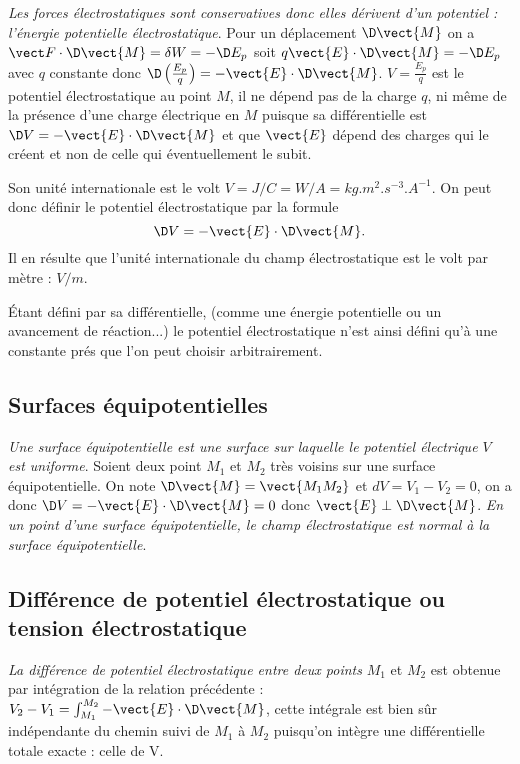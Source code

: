 \emph{Les forces électrostatiques sont conservatives donc elles dérivent d'un potentiel : l'énergie potentielle électrostatique}. Pour un déplacement $\D \vect{M}$ on a $\vF \cdot \D \vect{M}=\delta W = -\D E_p$ soit $ q \vect{E} \cdot \D \vect{M}=-\D E_p$ avec $q$ constante donc $\D \left(\frac{E_p}{q}\right) = -\vect{E} \cdot \D \vect{M}$.
$V = \frac{E_p}{q}$ est le potentiel électrostatique au point $M$, il ne dépend pas de la charge $q$, ni même de la présence d'une charge électrique en $M$ puisque sa différentielle est $\D V = -\vect{E} \cdot \D \vect{M}$ et que $\vect{E}$ dépend des charges qui le créent et non de celle qui éventuellement le subit.

Son unité internationale est le volt  $\si{V} = \si{J/C} =\si{W/A} = \si{kg.m^2.s^{-3}.A^{-1}}$. On peut donc définir le potentiel électrostatique par la formule
\begin{equation}
 \D V = -\vect{E} \cdot \D \vect{M}.
\end{equation}
Il en résulte que l'unité internationale du champ électrostatique est le volt par mètre : $\si{V/m}$.

Étant défini par sa différentielle, (comme une énergie potentielle ou un avancement de réaction...) le potentiel électrostatique n'est ainsi défini qu'à une constante prés que l'on peut choisir arbitrairement.

\subsection{Surfaces équipotentielles}
\label{chap9-subsec:surfacesequipotentielles}

\emph{Une surface équipotentielle est une surface sur laquelle le potentiel électrique $V$ est uniforme}. Soient deux point $M_1$ et $M_2$ très voisins sur une surface équipotentielle. On note $\D \vect{M}=\vect{M_1M_2}$ et $dV= V_1 - V_2 = 0$, on a donc $\D V = -\vect{E}\cdot\D \vect{M} = 0$  donc $\vect{E} \perp \D \vect{M}$.
\emph{En un point d'une surface équipotentielle, le champ électrostatique est normal à la surface équipotentielle}.

\subsection{Différence de potentiel électrostatique ou tension électrostatique}
\label{chap9-subsec:differencedepotentielelectrostatique}

\emph{La différence de potentiel électrostatique entre deux points} $M_1$ et $M_2$ est obtenue par intégration de la relation précédente :  $V_2 - V_1 = \int_{M_1}^{M_2} -\vect{E} \cdot \D \vect{M}$, cette intégrale est bien sûr indépendante du chemin suivi de $M_1$ à $M_2$ puisqu'on intègre une différentielle totale exacte : celle de V.

